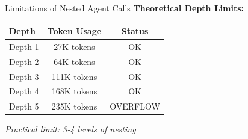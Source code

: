 \documentclass[aspectratio=169,11pt]{beamer}
\begin{document}
\begin{frame}{Limitations of Nested Agent Calls}
    \vspace{0.3cm}
    \textbf{Theoretical Depth Limits:}
    \begin{center}
    \begin{tabular}{lcc}
        \toprule
        \textbf{Depth} & \textbf{Token Usage} & \textbf{Status} \\
        \midrule
        Depth 1 & 27K tokens & OK \\
        Depth 2 & 64K tokens & OK \\
        Depth 3 & 111K tokens & OK \\
        Depth 4 & 168K tokens & OK \\
        Depth 5 & 235K tokens & OVERFLOW \\
        \bottomrule
    \end{tabular}
    \end{center}
    \textit{Practical limit: 3-4 levels of nesting}
\end{frame}
\end{document}
